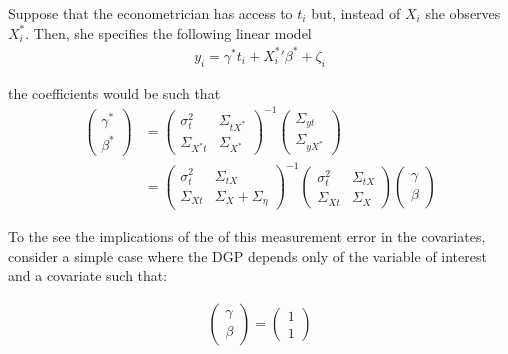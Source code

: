 \documentclass[12pt]{article}
\begin{document}
    Suppose that the econometrician has access to $t_i$ but, instead of $X_i$ she observes $X^*_i$. Then, she specifies the following linear model
    \begin{align}
        y_i = \gamma^* t_i + {X^{*}_i}' \beta^* + \zeta_i
    \end{align}

    the coefficients would be such that
    \begin{align}
        \left(\begin{array}{l}
    {\gamma}^* \\
    {\beta}^*
    \end{array}\right)&=\left(\begin{array}{cc}
    {\sigma}^2_{t} & \Sigma_{tX^*} \\
    \Sigma_{X^*t} & {\Sigma}_{X^*}
    \end{array}\right)^{-1}\left(\begin{array}{c}
    \Sigma_{yt} \\
    \Sigma_{yX^*}
    \end{array}\right) \\
    & =\left(\begin{array}{cc}
    {\sigma}^2_{t} & \Sigma_{tX} \\
    \Sigma_{Xt} & {\Sigma}_{X}+{\Sigma}_{\eta}
    \end{array}\right)^{-1}\left(\begin{array}{cc}
    {\sigma}^2_{t} & \Sigma_{tX} \\
    \Sigma_{Xt} & {\Sigma}_{X}
    \end{array}\right)\left(\begin{array}{l}
    {\gamma} \\
    {\beta}
    \end{array}\right)
    \end{align}

    To the see the implications of the of this measurement error in the covariates, consider a simple case where the DGP depends only of the variable of interest and a covariate such that:

    \begin{align}
        \left(\begin{array}{l}
    {\gamma} \\
    {\beta}
    \end{array}\right)=\left(\begin{array}{l}
    1 \\
    1
    \end{array}\right)
    \end{align}
\end{document}
